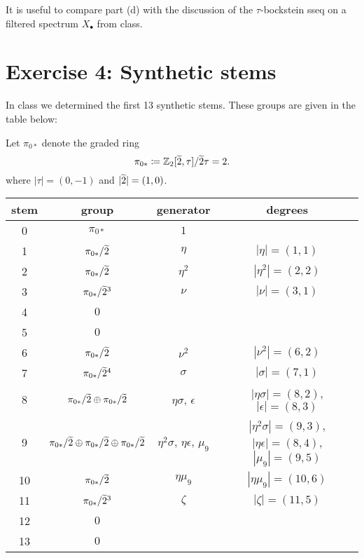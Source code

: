 \documentclass[reqno]{amsart}
\begin{document}
It is useful to compare part (d) with the discussion of the $\tau$-bockstein sseq on a filtered spectrum $X_\bullet$ from class.

\section{\bf Exercise 4: Synthetic stems}

In class we determined the first 13 synthetic stems.
These groups are given in the table below:


Let $\pi_{0*}$ denote the graded ring
\[ \pi_{0*} \coloneqq \Z_2[\wt{2}, \tau]/ \wt{2}\tau = 2. \]
where $|\tau| = (0,-1)$ and $|\wt{2}| = (1,0)$.

\begin{center}
  \begin{tabular}{|c|c|c|c|}\hline
    stem & group & generator & degrees \\\hline\hline
    0 & $\pi_{0*}$ & $1$ & \\\hline
    1 & $\pi_{0*}/\wt{2}$ & $\eta$ & $|\eta| = (1,1)$ \\\hline
    2 & $\pi_{0*}/\wt{2}$ & $\eta^2$ & $|\eta^2| = (2,2)$ \\\hline
    3 & $\pi_{0*}/\wt{2}^3$ & $\nu$ & $|\nu| = (3,1)$ \\\hline
    4 & $0$ & & \\\hline
    5 & $0$ & & \\\hline
    6 & $\pi_{0*}/\wt{2}$ & $\nu^2$ & $|\nu^2| = (6,2)$ \\\hline
    7 & $\pi_{0*}/\wt{2}^4$ & $\sigma$ & $|\sigma| = (7,1)$ \\\hline
    8 & $\pi_{0*}/\wt{2} \oplus \pi_{0*}/\wt{2}$ & $\eta\sigma$, $\epsilon$ & $|\eta\sigma| = (8,2)$, $|\epsilon| = (8,3)$\\\hline
    9 & $\pi_{0*}/\wt{2} \oplus \pi_{0*}/\wt{2} \oplus \pi_{0*}/\wt{2}$ & $\eta^2\sigma$, $\eta\epsilon$, $\mu_9$ & $|\eta^2\sigma| = (9,3)$, $|\eta\epsilon| = (8,4)$, $|\mu_9| = (9,5)$ \\\hline
    10 & $\pi_{0*}/\wt{2}$ & $\eta\mu_9$ & $|\eta\mu_9| = (10,6)$ \\\hline
    11 & $\pi_{0*}/\wt{2}^3$ & $\zeta$ & $|\zeta| = (11, 5)$ \\\hline
    12 & $0$ & & \\\hline
    13 & $0$& & \\\hline
  \end{tabular}
\end{center}
\end{document}
